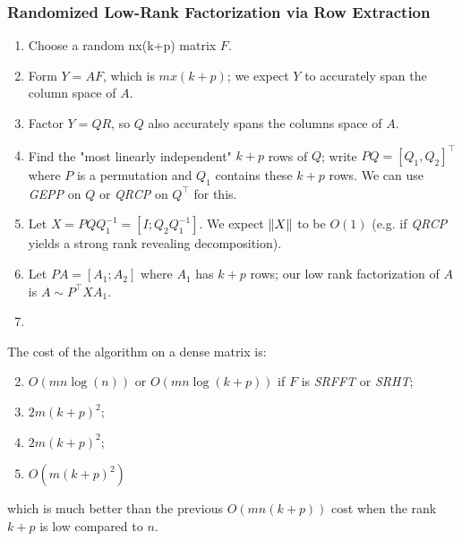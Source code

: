 \documentclass[11pt]{article}
\numberwithin{equation}{section}
\begin{document}
\subsubsection{Randomized Low-Rank Factorization via Row Extraction}
\begin{enumerate}
    \item Choose a random nx(k+p) matrix $F$.
    \item Form $Y=AF$, which is $mx(k+p)$; we expect $Y$ to accurately span the column space of $A$.
    \item Factor $Y=QR$, so $Q$ also accurately spans the columns space of $A$.
    \item Find the "most linearly independent" $k+p$ rows of $Q$; write $PQ = [Q_1,Q_2]^\top$ where $P$ is a permutation and $Q_1$ contains these $k+p$ rows. 
    We can use \textit{GEPP} on $Q$ or \textit{QRCP} on $Q^\top$ for this.
    \item Let $X = PQ Q_1^{-1} = [I;Q_2 Q_1^{-1}]$. We expect $\left\| X \right\|$ to be $O(1)$ (e.g. if \textit{QRCP} yields a strong rank revealing decomposition).
    \item Let $PA = [A_1;A_2]$ where $A_1$ has $k+p$ rows; our low rank factorization of $A$ is $A \sim P^\top XA_1$.
    \item 
\end{enumerate}

The cost of the algorithm on a dense matrix is: \begin{enumerate}
    \setcounter{enumi}{1}
    \item $O(mn\log(n))$ or $O(mn\log(k+p))$ if $F$ is \textit{SRFFT} or \textit{SRHT};
    \item $2m(k+p)^2$;
    \item $2m(k+p)^2$;
    \item $O(m(k+p)^2)$
\end{enumerate}
which is much better than the previous $O(mn(k+p))$ cost when the rank $k+p$ is low compared to $n$.
\end{document}
